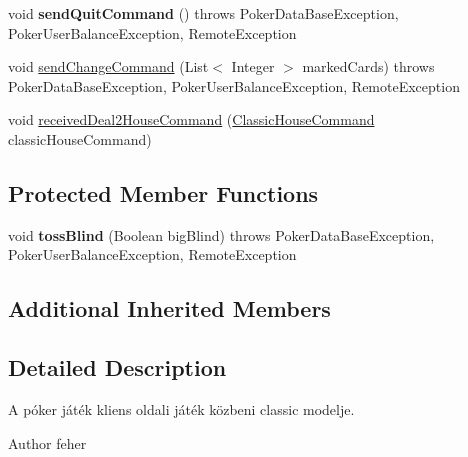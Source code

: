 \begin{DoxyCompactItemize}
\item 
\hypertarget{classhu_1_1elte_1_1bfw1p6_1_1poker_1_1client_1_1model_1_1_classic_main_game_model_a2c45e642fec4ae7e29a32f4b250184a2}{}void {\bfseries send\+Quit\+Command} ()  throws Poker\+Data\+Base\+Exception, Poker\+User\+Balance\+Exception, Remote\+Exception \label{classhu_1_1elte_1_1bfw1p6_1_1poker_1_1client_1_1model_1_1_classic_main_game_model_a2c45e642fec4ae7e29a32f4b250184a2}

\item 
void \hyperlink{classhu_1_1elte_1_1bfw1p6_1_1poker_1_1client_1_1model_1_1_classic_main_game_model_a56ce1a0be16141e91349e4392cc5fa4b}{send\+Change\+Command} (List$<$ Integer $>$ marked\+Cards)  throws Poker\+Data\+Base\+Exception, Poker\+User\+Balance\+Exception, Remote\+Exception 
\item 
void \hyperlink{classhu_1_1elte_1_1bfw1p6_1_1poker_1_1client_1_1model_1_1_classic_main_game_model_a7c3278b40f997996cc09ed41d8fd5a39}{received\+Deal2\+House\+Command} (\hyperlink{classhu_1_1elte_1_1bfw1p6_1_1poker_1_1command_1_1classic_1_1_classic_house_command}{Classic\+House\+Command} classic\+House\+Command)
\end{DoxyCompactItemize}
\subsection*{Protected Member Functions}
\begin{DoxyCompactItemize}
\item 
\hypertarget{classhu_1_1elte_1_1bfw1p6_1_1poker_1_1client_1_1model_1_1_classic_main_game_model_abacb20d310d0898c3db450183b1895a1}{}void {\bfseries toss\+Blind} (Boolean big\+Blind)  throws Poker\+Data\+Base\+Exception, Poker\+User\+Balance\+Exception, Remote\+Exception \label{classhu_1_1elte_1_1bfw1p6_1_1poker_1_1client_1_1model_1_1_classic_main_game_model_abacb20d310d0898c3db450183b1895a1}

\end{DoxyCompactItemize}
\subsection*{Additional Inherited Members}


\subsection{Detailed Description}
A póker játék kliens oldali játék közbeni classic modelje. \begin{DoxyAuthor}{Author}
feher 
\end{DoxyAuthor}



